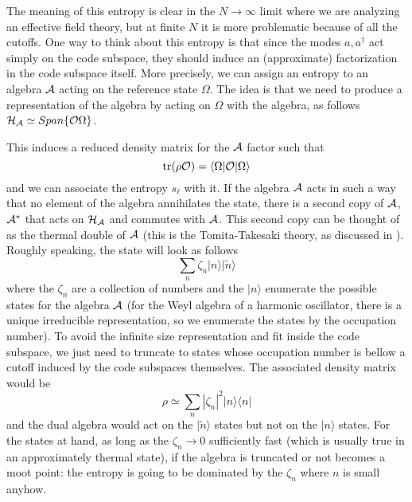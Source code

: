 \documentclass[12pt,nofootinbib, longbibliography]{revtex4-1}
\newcommand\ket[1]{| #1\rangle}
\newcommand\bra[1]{\langle #1|}
\newcommand{\CO}{  {\cal O}  }
\begin{document}
The meaning of this entropy is clear in the $N\to \infty$ limit where we are analyzing an effective field theory, but at finite $N$ it is more problematic because of all the cutoffs. One way to think about this entropy is that since the modes $a, a^\dagger$ act simply on the code subspace, they should induce an (approximate) factorization in the code subspace itself. More precisely, we can assign an entropy to an algebra  $\cal A$ acting on the reference state $\Omega$. The idea is that we need to produce a representation of the algebra by acting on $\Omega$ with the algebra, as follows ${\cal H_A}\simeq Span \{\CO \Omega \}$.

This induces a reduced density matrix for the ${\cal A}$ factor  such that 
\begin{equation}
\hbox{tr}(\rho {\cal O}) = \bra{\Omega} {\cal O}  \ket{\Omega}
\end{equation}
and we can associate the entropy $s_{\ell}$ with it.  If the algebra $\cal A$ acts in such a way that no element of the algebra annihilates the state, there is a second copy of ${\cal A}$, ${\cal A}^*$ that acts on ${\cal H_A}$ and commutes with $\cal A$. This second copy can be thought of as the thermal double of ${\cal A}$ (this is the Tomita-Takesaki theory, as discussed in \cite{Papadodimas:2013jku}). 
Roughly speaking, the state will look as follows
\begin{equation}
\sum_n \zeta_n \ket n \ket {\tilde n}
\end{equation}
where the $\zeta_n$ are a collection of  numbers and the $\ket n$ enumerate the possible states for the algebra $\cal A$ (for the Weyl algebra of a harmonic oscillator, there is a unique irreducible representation, so we enumerate the states by the occupation number). To avoid the infinite size representation and fit inside the code subspace,  we just need to truncate to states whose occupation number is bellow a cutoff induced by the code subspaces themselves.  The associated density matrix would be 
\begin{equation}
\rho \simeq \sum_n |\zeta_n|^2 \ket n \bra n
\end{equation}
and the dual algebra would act on the $\ket{\tilde n}$ states but not on the $\ket n$ states. For the states at hand, as long as the $\zeta_n\to 0$ sufficiently fast (which is usually true in an approximately thermal state), if the algebra is truncated or not becomes a moot point: the entropy is going to be dominated by the $\zeta_n$ where $n$ is small anyhow.
\end{document}
